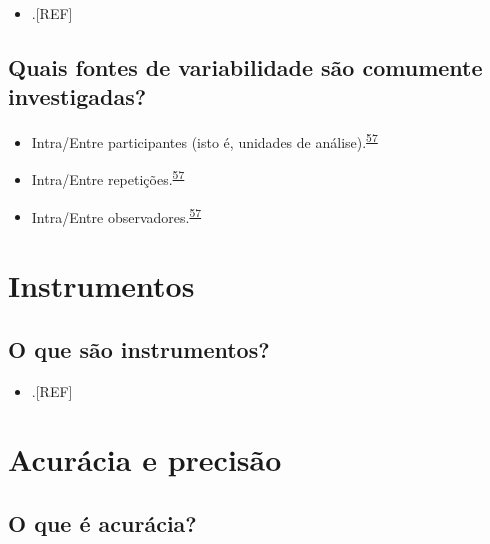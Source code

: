 \documentclass[
  a4paper,
]{book}
\providecommand{\tightlist}{%
  \setlength{\itemsep}{0pt}\setlength{\parskip}{0pt}}
\begin{document}
\begin{itemize}
\tightlist
\item
  .{[}REF{]}
\end{itemize}

\hypertarget{quais-fontes-de-variabilidade-suxe3o-comumente-investigadas}{%
\subsection{Quais fontes de variabilidade são comumente investigadas?}\label{quais-fontes-de-variabilidade-suxe3o-comumente-investigadas}}

\begin{itemize}
\item
  Intra/Entre participantes (isto é, unidades de análise).\textsuperscript{\protect\hyperlink{ref-altman1983}{57}}
\item
  Intra/Entre repetições.\textsuperscript{\protect\hyperlink{ref-altman1983}{57}}
\item
  Intra/Entre observadores.\textsuperscript{\protect\hyperlink{ref-altman1983}{57}}
\end{itemize}

\hypertarget{instrumentos}{%
\section{Instrumentos}\label{instrumentos}}

\hypertarget{o-que-suxe3o-instrumentos}{%
\subsection{O que são instrumentos?}\label{o-que-suxe3o-instrumentos}}

\begin{itemize}
\tightlist
\item
  .{[}REF{]}
\end{itemize}

\hypertarget{acuruxe1cia-e-precisuxe3o}{%
\section{Acurácia e precisão}\label{acuruxe1cia-e-precisuxe3o}}

\hypertarget{o-que-uxe9-acuruxe1cia}{%
\subsection{O que é acurácia?}\label{o-que-uxe9-acuruxe1cia}}
\end{document}
